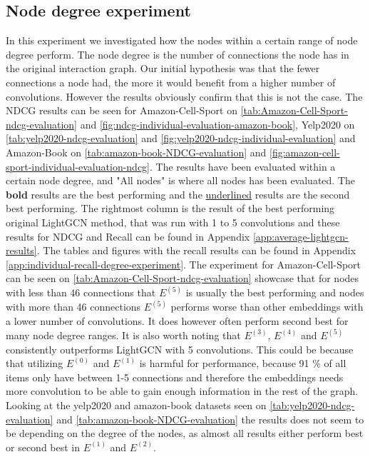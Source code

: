 \subsection{Node degree experiment}
In this experiment we investigated how the nodes within a certain range of node degree perform. 
The node degree is the number of connections the node has in the original interaction graph.
Our initial hypothesis was that the fewer connections a node had, the more it would benefit from a higher number of convolutions.
However the results obviously confirm that this is not the case.
The NDCG results can be seen for Amazon-Cell-Sport on \autoref{tab:Amazon-Cell-Sport-ndcg-evaluation} and \autoref{fig:ndcg-individual-evaluation-amazon-book}, Yelp2020 on \autoref{tab:yelp2020-ndcg-evaluation} and \autoref{fig:yelp2020-ndcg-individual-evaluation} and Amazon-Book on \autoref{tab:amazon-book-NDCG-evaluation} and \autoref{fig:amazon-cell-sport-individual-evaluation-ndcg}.
The results have been evaluated within a certain node degree, and "All nodes" is where all nodes has been evaluated.
The \textbf{bold} results are the best performing and the \underline{underlined} results are the second best performing.
The rightmost column is the result of the best performing original LightGCN method, that was run with 1 to 5 convolutions and these results for NDCG and Recall can be found in Appendix \ref{app:average-lightgcn-results}.
The tables and figures with the recall results can be found in Appendix \ref{app:individual-recall-degree-experiment}.
The experiment for Amazon-Cell-Sport can be seen on \autoref{tab:Amazon-Cell-Sport-ndcg-evaluation} showcase that for nodes with less than 46 connections that $E^{(5)}$ is usually the best performing and nodes with more than 46 connections $E^{(5)}$ performs worse than other embeddings with a lower number of convolutions.
It does however often perform second best for many node degree ranges.
It is also worth noting that $E^{(3)}$, $E^{(4)}$ and $E^{(5)}$ consistently outperforms LightGCN with 5 convolutions.
This could be because that utilizing $E^{(0)}$ and $E^{(1)}$ is harmful for performance, because 91 \% of all items only have between 1-5 connections and therefore the embeddings needs more convolution to be able to gain enough information in the rest of the graph.
Looking at the yelp2020 and amazon-book datasets seen on \autoref{tab:yelp2020-ndcg-evaluation} and \autoref{tab:amazon-book-NDCG-evaluation} the results does not seem to be depending on the degree of the nodes, as almost all results either perform best or second best in $E^{(1)}$ and $E^{(2)}$.
